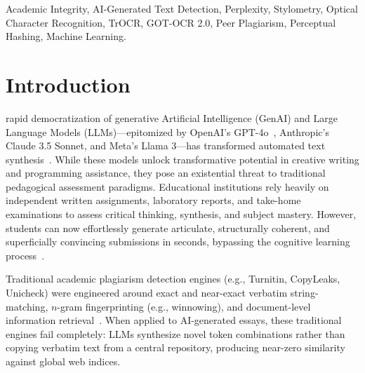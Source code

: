 \documentclass[journal]{IEEEtran}
\begin{document}
\begin{IEEEkeywords}
Academic Integrity, AI-Generated Text Detection, Perplexity, Stylometry, Optical Character Recognition, TrOCR, GOT-OCR 2.0, Peer Plagiarism, Perceptual Hashing, Machine Learning.
\end{IEEEkeywords}

\section{Introduction}
 rapid democratization of generative Artificial Intelligence (GenAI) and Large Language Models (LLMs)---epitomized by OpenAI's GPT-4o~\cite{achiam2023gpt4}, Anthropic's Claude 3.5 Sonnet, and Meta's Llama 3---has transformed automated text synthesis~\cite{brown2020language, foltynek2019academic}. While these models unlock transformative potential in creative writing and programming assistance, they pose an existential threat to traditional pedagogical assessment paradigms. Educational institutions rely heavily on independent written assignments, laboratory reports, and take-home examinations to assess critical thinking, synthesis, and subject mastery. However, students can now effortlessly generate articulate, structurally coherent, and superficially convincing submissions in seconds, bypassing the cognitive learning process~\cite{crothers2023machine}.

Traditional academic plagiarism detection engines (e.g., Turnitin, CopyLeaks, Unicheck) were engineered around exact and near-exact verbatim string-matching, $n$-gram fingerprinting (e.g., winnowing), and document-level information retrieval~\cite{meuschke2013analyzing, salton1988term}. When applied to AI-generated essays, these traditional engines fail completely: LLMs synthesize novel token combinations rather than copying verbatim text from a central repository, producing near-zero similarity against global web indices.
\end{document}
